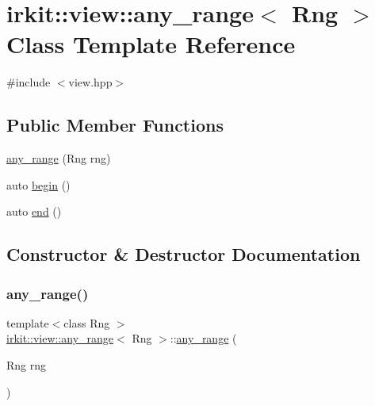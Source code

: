 \hypertarget{classirkit_1_1view_1_1any__range}{}\section{irkit\+:\+:view\+:\+:any\+\_\+range$<$ Rng $>$ Class Template Reference}
\label{classirkit_1_1view_1_1any__range}


{\ttfamily \#include $<$view.\+hpp$>$}

\subsection*{Public Member Functions}
\begin{DoxyCompactItemize}
\item 
\mbox{\hyperlink{classirkit_1_1view_1_1any__range_ac131324e05db1e661c610ee577c7ac7f}{any\+\_\+range}} (Rng rng)
\item 
auto \mbox{\hyperlink{classirkit_1_1view_1_1any__range_a99da248f7fb3fa9e78300f80ee9c8409}{begin}} ()
\item 
auto \mbox{\hyperlink{classirkit_1_1view_1_1any__range_a192d3e988c56a36695f9ad11c36cb5a6}{end}} ()
\end{DoxyCompactItemize}


\subsection{Constructor \& Destructor Documentation}
\mbox{\label{classirkit_1_1view_1_1any__range_ac131324e05db1e661c610ee577c7ac7f}} 
\subsubsection{\texorpdfstring{any\+\_\+range()}{any\_range()}}
{\footnotesize\ttfamily template$<$class Rng $>$ \\
\mbox{\hyperlink{classirkit_1_1view_1_1any__range}{irkit\+::view\+::any\+\_\+range}}$<$ Rng $>$\+::\mbox{\hyperlink{classirkit_1_1view_1_1any__range}{any\+\_\+range}} (\begin{DoxyParamCaption}\item[{Rng}]{rng }\end{DoxyParamCaption})\hspace{0.3cm}{\ttfamily [inline]}}



